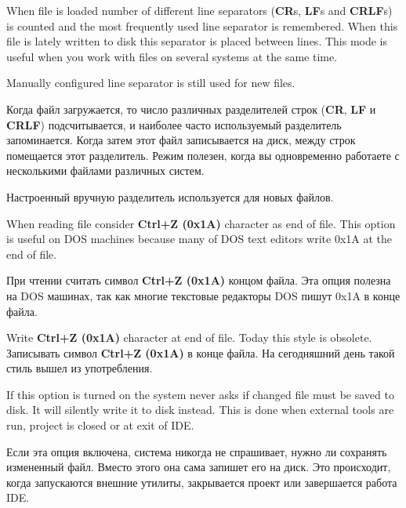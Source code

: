\begin{popup}
\ifenglish
\caption{Autodetect EOL style}
\else
\caption{Автообнаружение стиля EOL}
\fi
{}
\ifenglish
When file is loaded number of different line separators ({\bf CR}s, {\bf LF}s
and {\bf CRLF}s) is counted
and the most frequently used line separator is remembered. When this file is lately
written to disk this separator is placed between lines. This mode is useful
when you work with files on several systems at the same time.

Manually configured line separator is still used for new files.

\else
Когда файл загружается, то число различных разделителей строк ({\bf CR}, {\bf LF}
и {\bf CRLF}) подсчитывается, и наиболее часто используемый разделитель
запоминается. Когда затем этот файл записывается на диск, между строк помещается
этот разделитель. Режим полезен, когда вы одновременно работаете с несколькими
файлами различных систем.

Настроенный вручную разделитель используется для новых файлов.
\fi
\end{popup}

\begin{popup}
\ifenglish
\caption{Consider \^Z as EOF}
\else
\caption{Считать \^Z за EOF}
\fi
{}
\ifenglish
When reading file consider {\bf Ctrl+Z (0x1A)} character as end of file.
This option is useful on DOS machines because many of DOS text editors write
0x1A at the end of file.

\else
При чтении считать символ {\bf Ctrl+Z (0x1A)} концом файла.
Эта опция полезна на DOS машинах, так как многие текстовые редакторы DOS пишут
0x1A в конце файла.
\fi
\end{popup}

\begin{popup}
\ifenglish
\caption{Write \^Z at EOF}
\else
\caption{Писать \^Z как EOF}
\fi
{}
\ifenglish
Write {\bf Ctrl+Z (0x1A)} character at end of file. Today this style is obsolete.
\else
Записывать символ {\bf Ctrl+Z (0x1A)} в конце файла. На сегодняшний день такой стиль
вышел из употребления.
\fi
\end{popup}

\begin{popup}
\ifenglish
\caption{Autosave}
\else
\caption{Автосохранение}
\fi
{}

\ifenglish
If this option is turned on the system never asks if changed file must be saved to disk.
It will silently write it to disk instead. This is done when external tools are run, project
is closed or at exit of IDE.

\else
Если эта опция включена, система никогда не спрашивает, нужно ли сохранять измененный файл.
Вместо этого она сама запишет его на диск. Это происходит, когда запускаются внешние
утилиты, закрывается проект или завершается работа IDE.
\fi
\end{popup}

